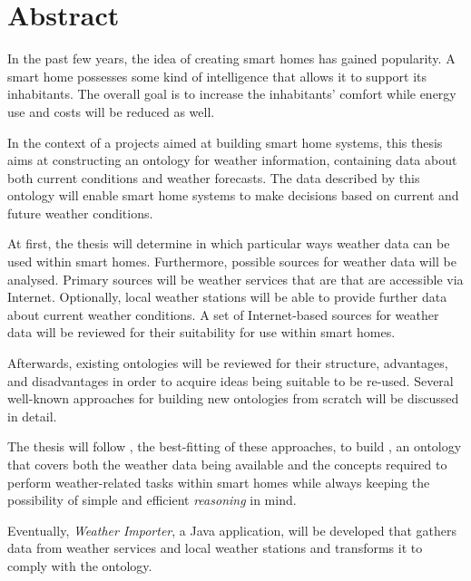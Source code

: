 \chapter*{Abstract}

In the past few years, the idea of creating smart homes has gained popularity. A smart home possesses some kind of intelligence that allows it to support its inhabitants. The overall goal is to increase the inhabitants' comfort while energy use and costs will be reduced as well.

In the context of a projects aimed at building smart home systems, this thesis aims at constructing an  ontology for weather information, containing data about both current conditions and weather forecasts. The data described by this ontology will enable smart home systems to make decisions based on current and future weather conditions.

At first, the thesis will determine in which particular ways weather data can be used within smart homes. Furthermore, possible sources for weather data will be analysed. Primary sources will be weather services that are that are accessible via Internet. Optionally, local weather stations will be able to provide further data about current weather conditions. A set of Internet-based sources for weather data will be reviewed for their suitability for use within smart homes.

Afterwards, existing ontologies will be reviewed for their structure, advantages, and disadvantages in order to acquire ideas being suitable to be re-used. Several well-known approaches for building new ontologies from scratch will be discussed in detail.

The thesis will follow \methontology, the best-fitting of these approaches, to build \smarthomeweather, an  ontology that covers both the weather data being available and the concepts required to perform weather-related tasks within smart homes while always keeping the possibility of simple and efficient \emph{ reasoning} in mind.

Eventually, \emph{Weather Importer}, a Java application, will be developed that gathers data from weather services and local weather stations and transforms it to comply with the \smarthomeweather ontology.
